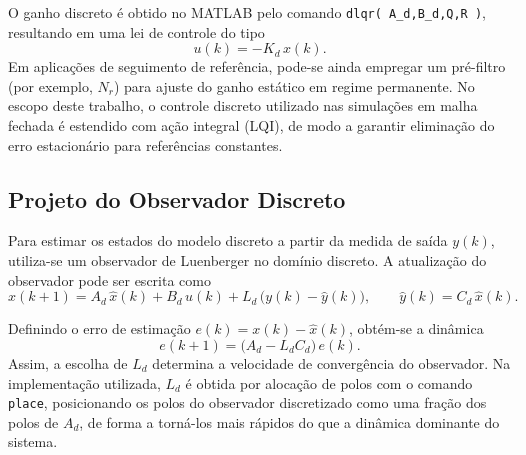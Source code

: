 O ganho discreto é obtido no MATLAB pelo comando \texttt{dlqr(\,A\_d,B\_d,Q,R\,)}, resultando em uma lei de controle do tipo
\begin{equation}
u(k) = -K_d\,x(k).
\end{equation}
Em aplicações de seguimento de referência, pode-se ainda empregar um pré-filtro (por exemplo, $N_r$) para ajuste do ganho estático em regime permanente. No escopo deste trabalho, o controle discreto utilizado nas simulações em malha fechada é estendido com ação integral (LQI), de modo a garantir eliminação do erro estacionário para referências constantes.

\subsection{Projeto do Observador Discreto}
\label{sec:projeto-observador-discreto}

Para estimar os estados do modelo discreto a partir da medida de saída $y(k)$, utiliza-se um observador de Luenberger no domínio discreto. A atualização do observador pode ser escrita como
\begin{equation}
\hat{x}(k+1) = A_d\,\hat{x}(k) + B_d\,u(k) + L_d\,\big(y(k) - \hat{y}(k)\big),
\qquad
\hat{y}(k) = C_d\,\hat{x}(k).
\end{equation}

Definindo o erro de estimação $e(k) = x(k) - \hat{x}(k)$, obtém-se a dinâmica
\begin{equation}
e(k+1) = \big(A_d - L_d C_d\big)\,e(k).
\end{equation}
Assim, a escolha de $L_d$ determina a velocidade de convergência do observador. Na implementação utilizada, $L_d$ é obtida por alocação de polos com o comando \texttt{place}, posicionando os polos do observador discretizado como uma fração dos polos de $A_d$, de forma a torná-los mais rápidos do que a dinâmica dominante do sistema.



